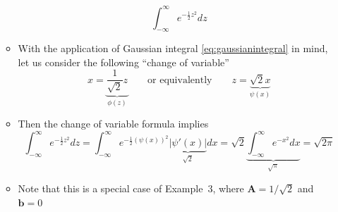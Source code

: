 \documentclass[12pt,a4paper]{article}
\begin{document}
\begin{itemize}
\begin{itemize}
    \begin{equation}\nonumber%
      \int_{-\infty}^{\infty}e^{-\frac{1}{2}z^{2}}dz
    \end{equation}
  \item With the application of Gaussian integral \eqref{eq:gaussianintegral} in mind,
    let us consider the following ``change of variable''
    \begin{equation}\nonumber%
      x = \underbrace{\frac{1}{\sqrt{2}} z}_{\phi(z)}
      \qquad \text{or equivalently} \qquad
      z = \underbrace{\sqrt{2}x}_{\psi(x)}
    \end{equation}
  \item Then the change of variable formula implies
    \begin{equation}\nonumber%
      \int_{-\infty}^{\infty}e^{-\frac{1}{2}z^{2}}dz
      =
      \int_{-\infty}^{\infty}e^{-\frac{1}{2}(\psi(x))^{2}}\underbrace{|\psi'(x)|}_{\sqrt{2}}dx
      =
      \sqrt{2}\underbrace{\int_{-\infty}^{\infty}e^{-x^{2}}dx}_{\sqrt{\pi}}
      =
      \sqrt{2\pi}
    \end{equation}
  \item Note that this is a special case of Example~3, where $\bm{A}=1/\sqrt{2}$ and $\bm{b}=0$
  \end{itemize}

\end{itemize}
\end{document}
